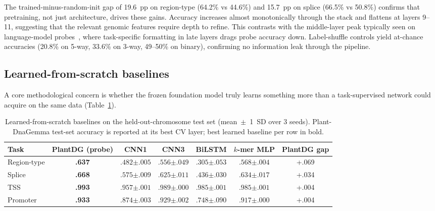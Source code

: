 \documentclass[11pt, a4paper]{article}
\begin{document}
The trained-minus-random-init gap of 19.6~pp on region-type
(64.2\% vs 44.6\%) and 15.7~pp on splice (66.5\% vs 50.8\%) confirms that
pretraining, not just architecture, drives these gains. Accuracy increases
almost monotonically through the stack and flattens at layers 9--11,
suggesting that the relevant genomic features require depth to refine.
This contrasts with the middle-layer peak typically seen on language-model
probes~\citep{tenney2019bert}, where task-specific formatting in late
layers drags probe accuracy down. Label-shuffle controls yield at-chance
accuracies (20.8\% on 5-way, 33.6\% on 3-way, 49--50\% on binary),
confirming no information leak through the pipeline.

\subsection*{Learned-from-scratch baselines}
\label{sec:baselines}

A core methodological concern is whether the frozen foundation model
truly learns something more than a task-supervised network could acquire
on the same data (Table~\ref{tab:baselines}).

\begin{table}[t]
\centering
\small
\caption{Learned-from-scratch baselines on the held-out-chromosome test set
(mean~$\pm$~1~SD over 3 seeds). Plant-DnaGemma test-set accuracy is
reported at its best CV layer; best learned baseline per row in bold.}
\label{tab:baselines}
\begin{tabular}{lcccccc}
\toprule
Task & PlantDG (probe) & CNN1 & CNN3 & BiLSTM & $k$-mer MLP & PlantDG gap \\
\midrule
Region-type & \textbf{.637} & $.482{\scriptstyle\pm.005}$ & $.556{\scriptstyle\pm.049}$ & $.305{\scriptstyle\pm.053}$ & $\mathbf{.568}{\scriptstyle\pm.004}$ & +.069 \\
Splice      & \textbf{.668} & $.575{\scriptstyle\pm.009}$ & $.625{\scriptstyle\pm.011}$ & $.436{\scriptstyle\pm.030}$ & $\mathbf{.634}{\scriptstyle\pm.017}$ & +.034 \\
TSS         & \textbf{.993} & $.957{\scriptstyle\pm.001}$ & $\mathbf{.989}{\scriptstyle\pm.000}$ & $.985{\scriptstyle\pm.001}$ & $.985{\scriptstyle\pm.001}$ & +.004 \\
Promoter    & \textbf{.933} & $.874{\scriptstyle\pm.003}$ & $\mathbf{.929}{\scriptstyle\pm.002}$ & $.748{\scriptstyle\pm.090}$ & $.917{\scriptstyle\pm.000}$ & +.004 \\
\bottomrule
\end{tabular}
\end{table}
\end{document}
